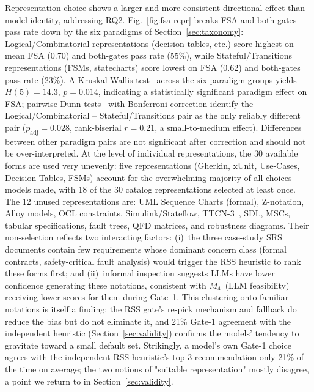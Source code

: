 \documentclass[conference]{IEEEtran}
\newcommand{\etc}{etc.}
\begin{document}
Representation choice shows a larger and more consistent directional effect
than model identity, addressing RQ2. Fig.~\ref{fig:fsa-repr} breaks FSA and
both-gates pass rate down by the six paradigms of
Section~\ref{sec:taxonomy}: Logical/Combinatorial representations (decision
tables, \etc) score highest on mean FSA (0.70) and both-gates pass rate
(55\%), while Stateful/Transitions representations (FSMs, statecharts) score
lowest on FSA (0.62) and both-gates pass rate (23\%). A Kruskal-Wallis test~\cite{kruskal1952,arcuri2014hitchhiker}
across the six paradigm groups yields $H(5)=14.3$, $p=0.014$, indicating a
statistically significant paradigm effect on FSA; pairwise Dunn tests~\cite{dunn1964} with
Bonferroni correction identify the Logical/Combinatorial -- Stateful/Transitions
pair as the only reliably different pair ($p_{\text{adj}}=0.028$,
rank-biserial $r=0.21$, a small-to-medium effect). Differences between
other paradigm pairs are not significant after correction and should not be
over-interpreted. At the level of individual representations, the 30 available forms are used
very unevenly: five representations (Gherkin, xUnit, Use-Cases, Decision
Tables, FSMs) account for the overwhelming majority of all choices models
made, with 18 of the 30 catalog representations selected at least once.
The 12 unused representations are: UML Sequence Charts (formal), Z-notation,
Alloy models, OCL constraints, Simulink/Stateflow, TTCN-3~\cite{grabowski2003ttcn3}, SDL, MSCs,
tabular specifications, fault trees, QFD matrices, and robustness diagrams.
Their non-selection reflects two interacting factors: (i)~the three
case-study SRS documents contain few requirements whose dominant concern
class (formal contracts, safety-critical fault analysis) would trigger the
RSS heuristic to rank these forms first; and (ii)~informal inspection suggests
LLMs have lower confidence generating these notations, consistent with
$M_4$~(LLM feasibility) receiving lower scores for them during Gate~1. This
clustering onto familiar notations is itself a finding: the RSS gate's
re-pick mechanism and fallback do reduce the bias but do not eliminate it,
and 21\% Gate-1 agreement with the independent heuristic (Section~\ref{sec:validity})
confirms the models' tendency to gravitate toward a small default set.
Strikingly, a model's own Gate-1 choice agrees
with the independent RSS heuristic's top-3 recommendation only 21\% of the
time on average; the two notions of "suitable representation" mostly
disagree, a point we return to in Section~\ref{sec:validity}.
\end{document}

